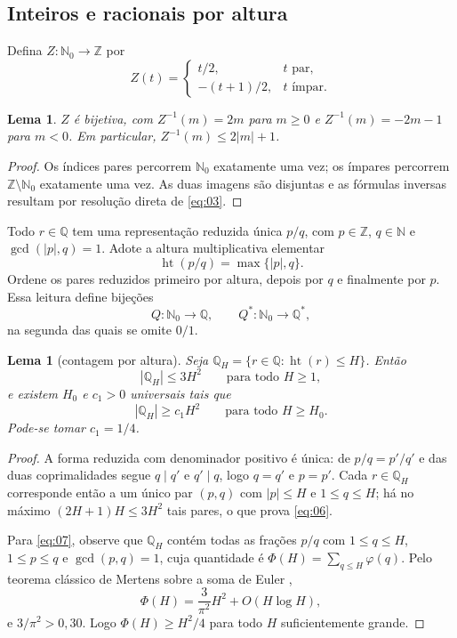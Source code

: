 \documentclass[11pt,a4paper]{article}
\theoremstyle{preciso}
\newtheorem{lema}[teorema]{Lema}
\theoremstyle{definition}
\newcommand{\N}{\mathbb N}
\newcommand{\Z}{\mathbb Z}
\newcommand{\Q}{\mathbb Q}
\newcommand{\heightq}{\operatorname{ht}}
\newcommand{\eqn}[2]{\begin{equation}\label{eq:#1}#2\end{equation}}
\begin{document}
\subsection{Inteiros e racionais por altura}
Defina $Z:\N_0\to\Z$ por
\eqn{03}{Z(t)=\begin{cases}t/2,&t\text{ par},\\-(t+1)/2,&t\text{ ímpar}.\end{cases}}
\begin{lema}
$Z$ é bijetiva, com $Z^{-1}(m)=2m$ para $m\ge0$ e $Z^{-1}(m)=-2m-1$ para $m<0$. Em particular, $Z^{-1}(m)\le2|m|+1$.
\end{lema}
\begin{proof}
Os índices pares percorrem $\N_0$ exatamente uma vez; os ímpares percorrem $\Z\setminus\N_0$ exatamente uma vez. As duas imagens são disjuntas e as fórmulas inversas resultam por resolução direta de \eqref{eq:03}.
\end{proof}

Todo $r\in\Q$ tem uma representação reduzida única $p/q$, com $p\in\Z$, $q\in\N$ e $\gcd(|p|,q)=1$. Adote a altura multiplicativa elementar
\eqn{04}{\heightq(p/q)=\max\{|p|,q\}.}
Ordene os pares reduzidos primeiro por altura, depois por $q$ e finalmente por $p$. Essa leitura define bijeções
\eqn{05}{Q:\N_0\to\Q,\qquad Q^*:\N_0\to\Q^*,}
na segunda das quais se omite $0/1$.

\begin{lema}[contagem por altura]
Seja $\Q_H=\{r\in\Q:\heightq(r)\le H\}$. Então
\eqn{06}{|\Q_H|\le3H^2\qquad\text{para todo }H\ge1,}
e existem $H_0$ e $c_1>0$ universais tais que
\eqn{07}{|\Q_H|\ge c_1H^2\qquad\text{para todo }H\ge H_0.}
Pode-se tomar $c_1=1/4$.
\end{lema}
\begin{proof}
A forma reduzida com denominador positivo é única: de $p/q=p'/q'$ e das duas coprimalidades segue $q\mid q'$ e $q'\mid q$, logo $q=q'$ e $p=p'$. Cada $r\in\Q_H$ corresponde então a um único par $(p,q)$ com $|p|\le H$ e $1\le q\le H$; há no máximo $(2H+1)H\le3H^2$ tais pares, o que prova \eqref{eq:06}.

Para \eqref{eq:07}, observe que $\Q_H$ contém todas as frações $p/q$ com $1\le q\le H$, $1\le p\le q$ e $\gcd(p,q)=1$, cuja quantidade é $\Phi(H)=\sum_{q\le H}\varphi(q)$. Pelo teorema clássico de Mertens sobre a soma de Euler \citep[Teorema 330]{hardy2008},
\[
\Phi(H)=\frac3{\pi^2}H^2+O(H\log H),
\]
e $3/\pi^2>0{,}30$. Logo $\Phi(H)\ge H^2/4$ para todo $H$ suficientemente grande.
\end{proof}
\end{document}
